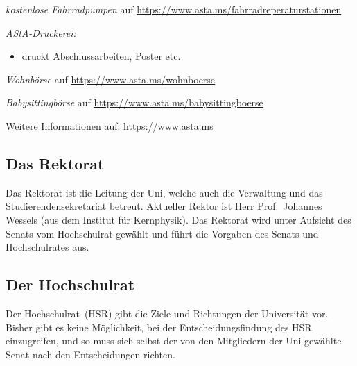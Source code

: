 \begin{multicols*}{2}
\begin{center}
{\begin{minipage}{0.95\columnwidth}
		\textit{kostenlose Fahrradpumpen} auf \url{https://www.asta.ms/fahrradreperaturstationen}
		
		\textit{AStA-Druckerei:}
		\begin{itemize}
			\item druckt Abschlussarbeiten, Poster etc.
		\end{itemize}
			
		\textit{Wohnbörse} auf \url{https://www.asta.ms/wohnboerse}
		
		\textit{Babysittingbörse} auf \url{https://www.asta.ms/babysittingboerse}

		\medskip
		\small
		Weitere Informationen auf: \url{https://www.asta.ms}
	\end{minipage}
	}
\end{center}


\subsection{Das Rektorat}
Das Rektorat ist die Leitung der Uni, welche auch die Verwaltung und das Studierendensekretariat betreut.
Aktueller Rektor ist Herr Prof.\ Johannes Wessels (aus dem Institut für Kernphysik).
Das Rektorat wird unter Aufsicht des Senats vom Hochschulrat gewählt und führt die Vorgaben des Senats und Hochschulrates aus.


\subsection{Der Hochschulrat}
Der Hochschulrat~(HSR) gibt die Ziele und Richtungen der Universität vor.
Bisher gibt es keine Möglichkeit, bei der Entscheidungsfindung des HSR einzugreifen, und so muss sich selbst der von den Mitgliedern der Uni gewählte Senat nach den Entscheidungen richten.


\end{multicols*}

